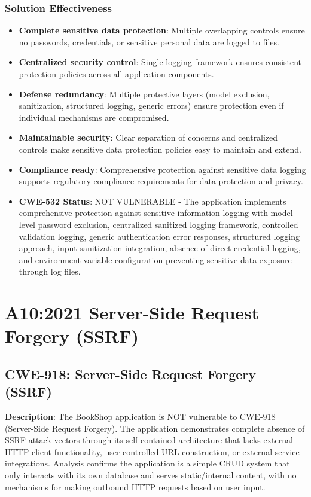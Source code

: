 \documentclass[]{UCD_CS_FYP_Report}
\begin{document}
\subsection{Solution Effectiveness}
\begin{itemize}
	\item \textbf{Complete sensitive data protection}: Multiple overlapping controls ensure no passwords, credentials, or sensitive personal data are logged to files.
	\item \textbf{Centralized security control}: Single logging framework ensures consistent protection policies across all application components.
	\item \textbf{Defense redundancy}: Multiple protective layers (model exclusion, sanitization, structured logging, generic errors) ensure protection even if individual mechanisms are compromised.
	\item \textbf{Maintainable security}: Clear separation of concerns and centralized controls make sensitive data protection policies easy to maintain and extend.
	\item \textbf{Compliance ready}: Comprehensive protection against sensitive data logging supports regulatory compliance requirements for data protection and privacy.
\end{itemize}

\begin{itemize}
	\item \textbf{CWE-532 Status}: NOT VULNERABLE - The application implements comprehensive protection against sensitive information logging with model-level password exclusion, centralized sanitized logging framework, controlled validation logging, generic authentication error responses, structured logging approach, input sanitization integration, absence of direct credential logging, and environment variable configuration preventing sensitive data exposure through log files.
\end{itemize}

\chapter{A10:2021 Server-Side Request Forgery (SSRF)}

\section{CWE-918: Server-Side Request Forgery (SSRF)}

\textbf{Description}: The BookShop application is NOT vulnerable to CWE-918 (Server-Side Request Forgery). The application demonstrates complete absence of SSRF attack vectors through its self-contained architecture that lacks external HTTP client functionality, user-controlled URL construction, or external service integrations. Analysis confirms the application is a simple CRUD system that only interacts with its own database and serves static/internal content, with no mechanisms for making outbound HTTP requests based on user input.
\end{document}
